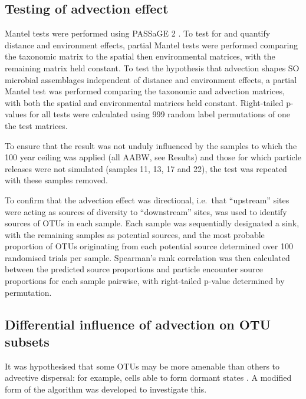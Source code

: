 \subsection{Testing of advection effect}

Mantel tests were performed using \ac{PASSaGE 2} \cite{Rosenberg:2011uz}.
To test for and quantify distance and environment effects, partial Mantel tests were performed comparing the taxonomic matrix to the spatial then environmental matrices, with the remaining matrix held constant.
To test the hypothesis that advection shapes \ac{SO} microbial assemblages independent of distance and environment effects, a partial Mantel test was performed comparing the taxonomic and advection matrices, with both the spatial and environmental matrices held constant.
Right-tailed p-values for all tests were calculated using 999 random label permutations of one the test matrices.

To ensure that the result was not unduly influenced by the samples to which the 100 year ceiling was applied (all \ac{AABW}, see Results) and those for which particle releases were not simulated (samples 11, 13, 17 and 22), the test was repeated with these samples removed.

To confirm that the advection effect was directional, i.e.\ that ``upstream'' sites were acting as sources of diversity to ``downstream'' sites,  \cite{Knights:2011in} was used to identify sources of \acp{OTU} in each sample.
Each sample was sequentially designated a sink, with the remaining samples as potential sources, and the most probable proportion of \acp{OTU} originating from each potential source determined over 100 randomised trials per sample.
Spearman's rank correlation was then calculated between the  predicted source proportions and particle encounter source proportions for each sample pairwise, with right-tailed p-value determined by permutation.

\subsection{Differential influence of advection on OTU subsets}

It was hypothesised that some \acp{OTU} may be more amenable than others to advective dispersal: for example, cells able to form dormant states \cite{Bissett:2010wj}.
A modified form of the  algorithm \cite{Clarke:1998ki} was developed to investigate this.


